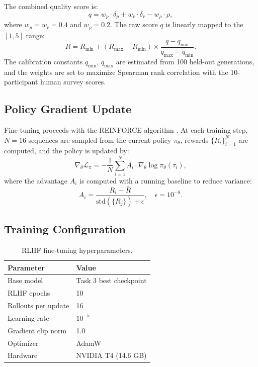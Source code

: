 \documentclass{article}
\begin{document}
The combined quality score is:
\begin{equation}
  q = w_p \cdot \delta_p + w_r \cdot \delta_r - w_\rho \cdot \rho,
\end{equation}
where $w_p = w_r = 0.4$ and $w_\rho = 0.2$. The raw score $q$ is linearly mapped to the $[1, 5]$ range:
\begin{equation}
  R = R_{\min} + (R_{\max} - R_{\min}) \times \frac{q - q_{\min}}{q_{\max} - q_{\min}}.
\end{equation}
The calibration constants $q_{\min}$, $q_{\max}$ are estimated from 100 held-out generations, and the weights are set to maximize Spearman rank correlation with the 10-participant human survey scores.

\subsection{Policy Gradient Update}

Fine-tuning proceeds with the REINFORCE algorithm \cite{williams1992simple}. At each training step, $N = 16$ sequences are sampled from the current policy $\pi_\theta$, rewards $\{R_i\}_{i=1}^{N}$ are computed, and the policy is updated by:
\begin{equation}
  \nabla_\theta \mathcal{L}_\pi = -\frac{1}{N}\sum_{i=1}^{N} A_i \cdot \nabla_\theta \log \pi_\theta(\tau_i),
\end{equation}
where the advantage $A_i$ is computed with a running baseline to reduce variance:
\begin{equation}
  A_i = \frac{R_i - \bar{R}}{\mathrm{std}(\{R_j\}) + \epsilon}, \quad \epsilon = 10^{-8}.
\end{equation}

\subsection{Training Configuration}

\begin{table}[h]
  \caption{RLHF fine-tuning hyperparameters.}
  \label{tab:rlhf_config}
  \centering
  \begin{tabular}{ll}
    \toprule
    Parameter & Value \\
    \midrule
    Base model & Task 3 best checkpoint \\
    RLHF epochs & 10 \\
    Rollouts per update & 16 \\
    Learning rate & $10^{-5}$ \\
    Gradient clip norm & 1.0 \\
    Optimizer & AdamW \\
    Hardware & NVIDIA T4 (14.6 GB) \\
    \bottomrule
  \end{tabular}
\end{table}
\end{document}
